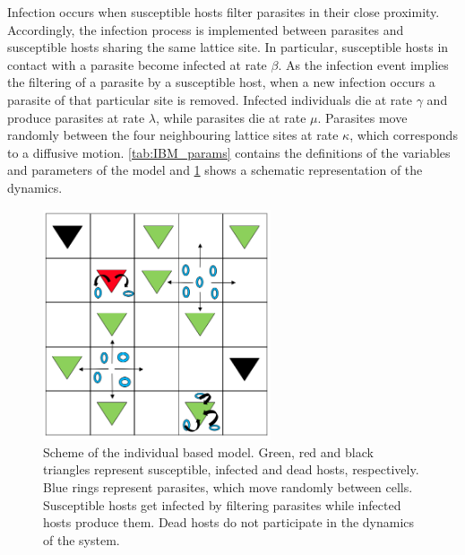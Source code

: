 Infection occurs when susceptible hosts filter parasites in their close
proximity. Accordingly, the infection process is implemented between parasites
and susceptible hosts sharing the same lattice site. In particular, susceptible
hosts in contact with a parasite become infected at rate $\beta$. As the
infection event implies the filtering of a parasite by a susceptible host, when
a new infection occurs a parasite of that particular site is removed. Infected
individuals die at rate $\gamma$ and produce parasites at rate $\lambda$, while
parasites die at rate $\mu$. Parasites move randomly between the four
neighbouring lattice sites at rate $\kappa$, which corresponds to a diffusive
motion. \cref{tab:IBM_params} contains the definitions of the variables and
parameters of the model and \cref{fig:IBM} shows a schematic representation of
the dynamics.

\begin{figure}[H]
    \centering
    \includegraphics[width=0.6\textwidth]{Figures/IBM.png}
    \caption{Scheme of the individual based model. Green, red and black
        triangles represent susceptible, infected and dead hosts, respectively.
        Blue
        rings represent parasites, which move randomly between cells.
        Susceptible hosts
        get infected by filtering parasites while infected hosts produce them.
        Dead
        hosts do not participate in the dynamics of the system.}
    \label{fig:IBM}
\end{figure}

